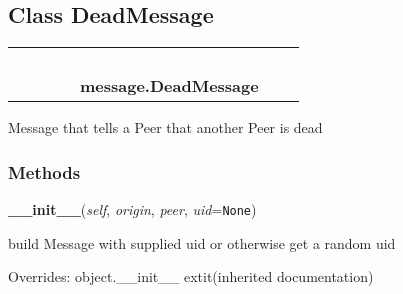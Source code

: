 

\subsection{Class DeadMessage}

    \label{message:DeadMessage}
\begin{tabular}{cccccccc}
\multicolumn{2}{r}{\settowidth{\BCL}{object}\multirow{2}{\BCL}{object}}
&&
&&
  \\\cline{3-3}
  &&\multicolumn{1}{c|}{}
&&
&&
  \\
\multicolumn{4}{r}{\settowidth{\BCL}{message.Message}\multirow{2}{\BCL}{message.Message}}
&&
  \\\cline{5-5}
  &&&&\multicolumn{1}{c|}{}
&&
  \\
&&&&\multicolumn{2}{l}{\textbf{message.DeadMessage}}
\end{tabular}

Message that tells a Peer that another Peer is dead



  \subsubsection{Methods}

    \vspace{0.5ex}

\hspace{.8\funcindent}\begin{boxedminipage}{\funcwidth}

    \raggedright \textbf{\_\_init\_\_}(\textit{self}, \textit{origin}, \textit{peer}, \textit{uid}={\tt None})

\setlength{\parskip}{2ex}
    build Message with supplied uid or otherwise get a random uid

\setlength{\parskip}{1ex}
      Overrides: object.\_\_init\_\_ 	extit{(inherited documentation)}

    \end{boxedminipage}

